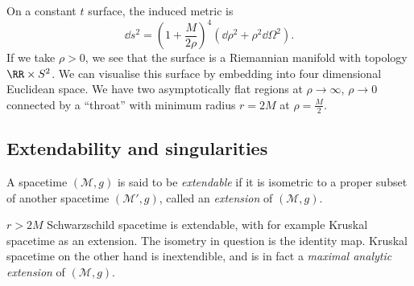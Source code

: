 \documentclass{jknotes}
\begin{document}
On a constant \(t\) surface, the induced metric is
\begin{equation}
    \dd{s}^2 = \left(1+\frac{M}{2\rho}\right)^4 (\dd{\rho}^2+\rho^2\dd{\Omega}^2).
\end{equation}
If we take \(\rho>0\), we see that the surface is a Riemannian manifold with topology \(\RR\times S^2\). We can visualise this surface by embedding into four dimensional Euclidean space.
We have two asymptotically flat regions at \(\rho\to\infty\), \(\rho\to0\) connected by a ``throat'' with minimum radius \(r=2M\) at \(\rho = \frac{M}{2}\).

\subsection{Extendability and singularities}
\begin{defn}
    A spacetime \((\mathcal{M},g)\) is said to be \emph{extendable} if it is isometric to a proper subset of another spacetime \((\mathcal{M}',g)\), called an \emph{extension} of \((\mathcal{M},g)\).
\end{defn}
\begin{eg}
    \(r>2M\) Schwarzschild spacetime is extendable, with for example Kruskal spacetime as an extension. The isometry in question is the identity map.
    Kruskal spacetime on the other hand is inextendible, and is in fact a \emph{maximal analytic extension} of \((\mathcal{M},g)\).
\end{eg}
\end{document}

